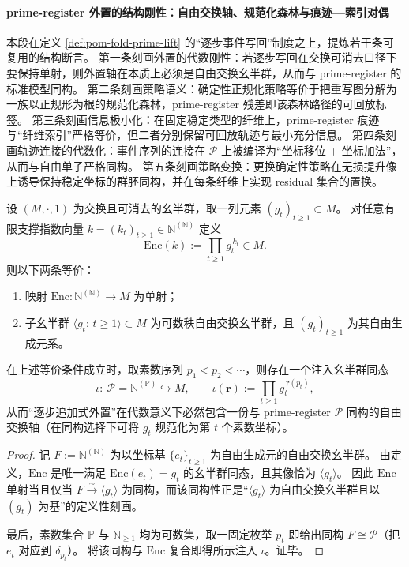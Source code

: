 \paragraph{prime-register 外置的结构刚性：自由交换轴、规范化森林与痕迹—索引对偶}\label{para:pom-fold-prime-register-rigidity-forest-trace-index}
本段在定义 \ref{def:pom-fold-prime-lift} 的“逐步事件写回”制度之上，提炼若干条可复用的结构断言。
第一条刻画外置的代数刚性：若逐步写回在交换可消去口径下要保持单射，则外置轴在本质上必须是自由交换幺半群，从而与 prime-register 的标准模型同构。
第二条刻画策略语义：确定性正规化策略等价于把重写图分解为一族以正规形为根的规范化森林，prime-register 残差即该森林路径的可回放标签。
第三条刻画信息极小化：在固定稳定类型的纤维上，prime-register 痕迹与“纤维索引”严格等价，但二者分别保留可回放轨迹与最小充分信息。
第四条刻画轨迹连接的代数化：事件序列的连接在 \(\mathcal P\) 上被编译为“坐标移位 + 坐标加法”，从而与自由单子严格同构。
第五条刻画策略变换：更换确定性策略在无损提升像上诱导保持稳定坐标的群胚同构，并在每条纤维上实现 residual 集合的置换。

\begin{theorem}\label{thm:pom-stepwise-externalization-free-commutative-rigidity}
设 \((M,\cdot,1)\) 为交换且可消去的幺半群，取一列元素 \((g_t)_{t\ge 1}\subset M\)。
对任意有限支撑指数向量 \(k=(k_t)_{t\ge 1}\in \mathbb{N}^{(\mathbb{N})}\) 定义
\[
\mathrm{Enc}(k):=\prod_{t\ge 1} g_t^{\,k_t}\in M.
\]
则以下两条等价：
\begin{enumerate}
  \item 映射 \(\mathrm{Enc}:\mathbb{N}^{(\mathbb{N})}\to M\) 为单射；
  \item 子幺半群 \(\langle g_t:\,t\ge 1\rangle\subset M\) 为可数秩自由交换幺半群，且 \((g_t)_{t\ge 1}\) 为其自由生成元系。
\end{enumerate}
在上述等价条件成立时，取素数序列 \(p_1<p_2<\cdots\)，则存在一个注入幺半群同态
\[
\iota:\ \mathcal{P}=\mathbb{N}^{(\mathbb{P})}\hookrightarrow M,
\qquad
\iota(\mathbf r):=\prod_{t\ge 1} g_t^{\,\mathbf r(p_t)},
\]
从而“逐步追加式外置”在代数意义下必然包含一份与 prime-register \(\mathcal{P}\) 同构的自由交换轴（在同构选择下可将 \(g_t\) 规范化为第 \(t\) 个素数坐标）。
\end{theorem}
\begin{proof}
记 \(F:=\mathbb{N}^{(\mathbb{N})}\) 为以坐标基 \(\{e_t\}_{t\ge 1}\) 为自由生成元的自由交换幺半群。
由定义，\(\mathrm{Enc}\) 是唯一满足 \(\mathrm{Enc}(e_t)=g_t\) 的幺半群同态，且其像恰为 \(\langle g_t\rangle\)。
因此 \(\mathrm{Enc}\) 单射当且仅当 \(F\xrightarrow{\sim}\langle g_t\rangle\) 为同构，而该同构性正是“\(\langle g_t\rangle\) 为自由交换幺半群且以 \((g_t)\) 为基”的定义性刻画。
\par
最后，素数集合 \(\mathbb{P}\) 与 \(\mathbb{N}_{\ge 1}\) 均为可数集，取一固定枚举 \(p_t\) 即给出同构 \(F\cong \mathcal{P}\)（把 \(e_t\) 对应到 \(\delta_{p_t}\)）。
将该同构与 \(\mathrm{Enc}\) 复合即得所示注入 \(\iota\)。证毕。
\end{proof}

